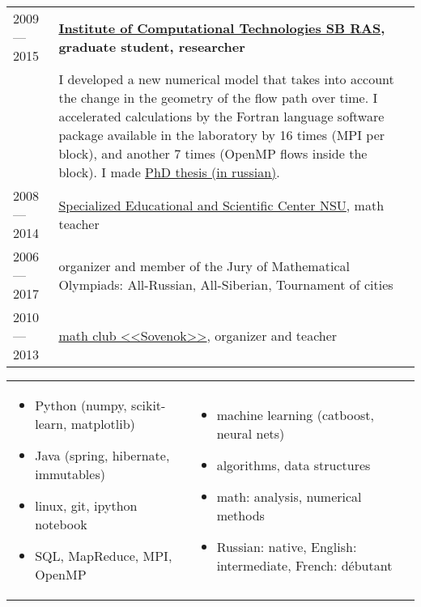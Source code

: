\documentclass[11pt]{article}
\begin{document}
\begin{longtable} {l | p{}}
2009 — 2015 & {\textbf{\href{http://www.ict.nsc.ru}{Institute of Computational Technologies SB RAS}, graduate student, researcher}}\\

& {I developed a new numerical model that takes into account the change in the geometry of the flow path over time. I accelerated calculations by the Fortran language software package available in the laboratory by 16 times (MPI per block), and another 7 times (OpenMP flows inside the block). I made \href{https://github.com/avalur/dissertation/blob/master/to_print/autoref_Avdyushenko.pdf}{PhD thesis (in russian)}.} \\

2008 — 2014 & {\href{http://sesc.nsu.ru}{Specialized Educational and Scientific Center NSU}, math teacher}\\
2006 — 2017 & {organizer and member of the Jury of Mathematical Olympiads: All-Russian, All-Siberian, Tournament of cities}\\
2010 — 2013 & {\href{https://www.sovenok.academy/}{math club <<Sovenok>>}, organizer and teacher}\\

\end{longtable}

\vspace{-1em}
\begin{longtable} {p{}p{}}
\vspace{-2em}
\begin{itemize}
	\item Python (numpy, scikit-learn, matplotlib)
	\item Java (spring, hibernate, immutables)
	\item linux, git, ipython notebook
	\item SQL, MapReduce, MPI, OpenMP
\end{itemize}
&
\vspace{-2em}
\begin{itemize}
	\item machine learning (catboost, neural nets)
	\item algorithms, data structures
	\item math: analysis, numerical methods
	\item Russian: native, English: intermediate, French: débutant
\end{itemize}
\\
\end{longtable}
\end{document}
